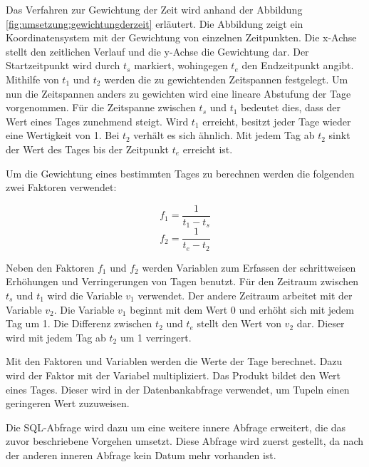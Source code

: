 Das Verfahren zur Gewichtung der Zeit wird anhand der Abbildung \ref{fig:umsetzung:gewichtungderzeit} erläutert. Die Abbildung zeigt ein Koordinatensystem mit der Gewichtung von einzelnen Zeitpunkten. Die x-Achse stellt den zeitlichen Verlauf und die y-Achse die Gewichtung dar. Der Startzeitpunkt wird durch $t_{s}$ markiert, wohingegen $t_{e}$ den Endzeitpunkt angibt. Mithilfe von $t_1$ und $t_2$ werden die zu gewichtenden Zeitspannen festgelegt. Um nun die Zeitspannen anders zu gewichten wird eine lineare Abstufung der Tage vorgenommen. Für die Zeitspanne zwischen $t_{s}$ und $t_1$ bedeutet dies, dass der Wert eines Tages zunehmend steigt. Wird $t_1$ erreicht, besitzt jeder Tage wieder eine Wertigkeit von 1. Bei $t_2$ verhält es sich ähnlich. Mit jedem Tag ab $t_2$ sinkt der Wert des Tages bis der Zeitpunkt $t_{e}$ erreicht ist.

Um die Gewichtung eines bestimmten Tages zu berechnen werden die folgenden zwei Faktoren verwendet:

\begin{equation}
f_1 = \frac{1}{t_1 - t_{s}}
\end{equation}
\begin{equation}
f_2 = \frac{1}{t_{e} - t_2}
\end{equation}

Neben den Faktoren $f_1$ und $f_2$ werden Variablen zum Erfassen der schrittweisen Erhöhungen und Verringerungen von Tagen benutzt. Für den Zeitraum zwischen   
$t_{s}$ und $t_{1}$ wird die Variable $v_{1}$ verwendet. Der andere Zeitraum arbeitet mit der Variable $v_{2}$. Die Variable $v_{1}$ beginnt mit dem Wert 0 und erhöht sich mit jedem Tag um 1. Die Differenz zwischen $t_{2}$ und $t_{e}$ stellt den Wert von $v_{2}$ dar. Dieser wird mit jedem Tag ab $t_{2}$ um 1 verringert.

Mit den Faktoren und Variablen werden die Werte der Tage berechnet. Dazu wird der Faktor mit der Variabel multipliziert. Das Produkt bildet den Wert eines Tages. Dieser wird in der Datenbankabfrage verwendet, um Tupeln einen geringeren Wert zuzuweisen. 

Die SQL-Abfrage wird dazu um eine weitere innere Abfrage erweitert, die das zuvor beschriebene Vorgehen umsetzt. Diese Abfrage wird zuerst gestellt, da nach der anderen inneren Abfrage kein Datum mehr vorhanden ist. 

